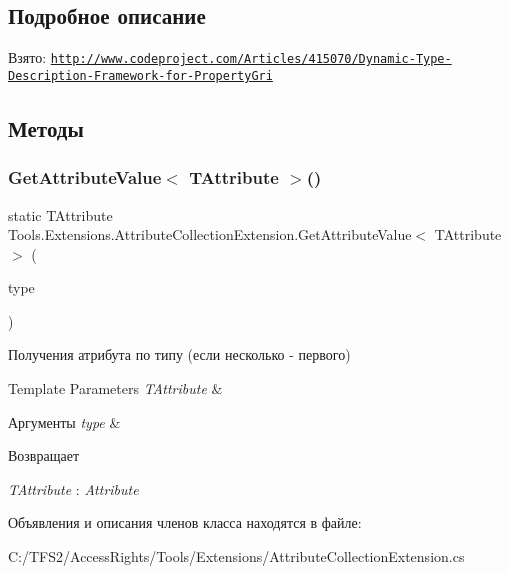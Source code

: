 \subsection{Подробное описание}
Взято\+: \href{http://www.codeproject.com/Articles/415070/Dynamic-Type-Description-Framework-for-PropertyGri}{\tt http\+://www.\+codeproject.\+com/\+Articles/415070/\+Dynamic-\/\+Type-\/\+Description-\/\+Framework-\/for-\/\+Property\+Gri} 



\subsection{Методы}
\mbox{\label{class_tools_1_1_extensions_1_1_attribute_collection_extension_a1f4b85797e4de84a1c3f535358d881d0}} 
\subsubsection{\texorpdfstring{Get\+Attribute\+Value$<$ T\+Attribute $>$()}{GetAttributeValue< TAttribute >()}}
{\footnotesize\ttfamily static T\+Attribute Tools.\+Extensions.\+Attribute\+Collection\+Extension.\+Get\+Attribute\+Value$<$ T\+Attribute $>$ (\begin{DoxyParamCaption}\item[{this Type}]{type }\end{DoxyParamCaption})\hspace{0.3cm}{\ttfamily [static]}}



Получения атрибута по типу (если несколько -\/ первого) 


\begin{DoxyTemplParams}{Template Parameters}
{\em T\+Attribute} & \\
\hline
\end{DoxyTemplParams}

\begin{DoxyParams}{Аргументы}
{\em type} & \\
\hline
\end{DoxyParams}
\begin{DoxyReturn}{Возвращает}

\end{DoxyReturn}
\begin{Desc}
\item[Согласование типов]\begin{description}
\item[{\em T\+Attribute} : {\em Attribute}]\end{description}
\end{Desc}


Объявления и описания членов класса находятся в файле\+:\begin{DoxyCompactItemize}
\item 
C\+:/\+T\+F\+S2/\+Access\+Rights/\+Tools/\+Extensions/Attribute\+Collection\+Extension.\+cs\end{DoxyCompactItemize}
